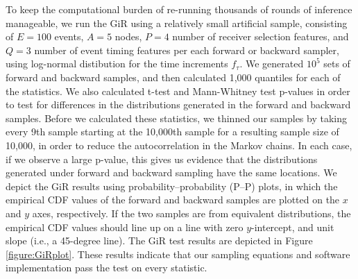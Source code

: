 \documentclass[ba]{imsart}
\numberwithin{equation}{section}
\theoremstyle{plain}
\begin{document}
	To keep the computational burden of re-running thousands of rounds of inference manageable, we run the GiR using a relatively small artificial sample, consisting of $E=100$ events, $A=5$ nodes, $P=4$ number of receiver selection features, and $Q=3$ number of event timing features per each forward or backward sampler, using log-normal distibution for the time increments $f_\tau$. We generated $10^5$ sets of forward and backward samples, and then calculated 1,000 quantiles for each of the statistics. We also calculated t-test and Mann-Whitney test p-values in order to test for differences in the distributions generated in the forward and backward samples. Before we calculated these statistics, we thinned our samples by taking every 9th sample starting at the 10,000th sample for a resulting sample size of 10,000, in order to reduce the autocorrelation in the Markov chains. In each case, if we observe a large p-value, this gives us evidence that the distributions generated under forward and backward sampling have the same locations. We depict the GiR results using probability--probability (P--P) plots, in which the empirical CDF values of the forward and backward samples are plotted on the $x$ and $y$ axes, respectively. If the two samples are from equivalent distributions, the empirical CDF values should line up on a line with zero $y$-intercept, and unit slope (i.e., a 45-degree line). The GiR test results are depicted in Figure \ref{figure:GiRplot}. These results indicate that our sampling equations and software implementation pass the test on every statistic.
\end{document}

